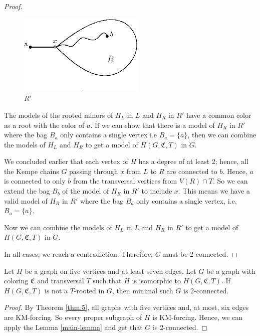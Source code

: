 \begin{proof}
 \begin{figure}[h]
  \centering
  \vspace{0.2cm}
  \includegraphics[width=6cm]{img/case2-2-connectedness}
  \vspace{0.2cm}
  \caption{$R'$}
  \label{fig:case2-2-connectedness}
\end{figure}

The models of the rooted minors of $H_L$ in $L$ and $H_R$ in $R'$ have a common color as a root with the color of $a$. If we can show that 
there is a model of $H_R$ in $R'$ where the bag $B_a$ only contains a single vertex i.e $B_a = \{a\}$, then we can combine the models of $H_L$ and $H_R$ to get a model of $H(G, \mathfrak{C}, T)$ in $G$. 

We concluded earlier that each vertex of $H$ has a degree of at least 2; hence, all the Kempe chains $G$ passing through $x$ from $L$ to $R$ are connected to $b$. 
Hence, $a$ is connected to only $b$ from the transversal vertices from $V(R) \cap T$. So we can extend the bag $B_b$ of the model of $H_R$ in $R'$ to include $x$.
This means we have a valid model of $H_R$ in $R'$ where the bag $B_a$ only contains a single vertex, i.e, $B_a = \{a\}$.

Now we can combine the models of $H_L$ in $L$ and $H_R$ in $R'$ to get a model of $H(G, \mathfrak{C}, T)$ in $G$.
   
 In all cases, we reach a contradiction. Therefore, $G$ must be 2-connected.
   \end{proof}

\begin{cor}
Let $H$ be a graph on five vertices and at least seven edges.
Let $G$ be a graph with coloring $\mathfrak{C}$ and transversal $T$ such that $H$ is isomorphic to $H(G, \mathfrak{C}, T)$.
If $H(G, \mathfrak{C}, T)$ is not a $T$-rooted in $G$, then minimal such $G$ is 2-connected.
\end{cor}
 
   \begin{proof}
 By Theorem \ref{thm:5}, all graphs with five vertices and, at most, six edges are KM-forcing. So every proper subgraph of $H$ is KM-forcing. 
 Hence, we can apply the Lemma \ref{main-lemma} and get that $G$ is 2-connected.
   \end{proof}